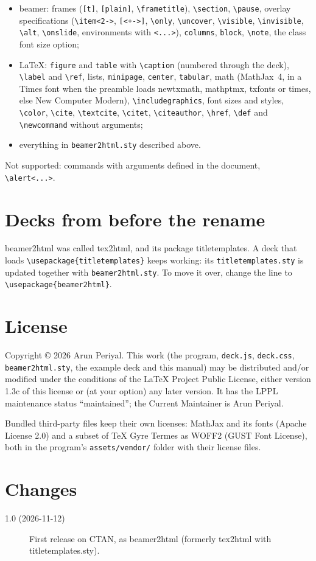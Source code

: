 \documentclass[a4paper,11pt]{article}
\newcommand\pkg{\textsf{beamer2html}}
\newcommand\cs[1]{\texttt{\textbackslash #1}}
\newcommand\env[1]{\texttt{#1}}
\newcommand\opt[1]{\texttt{#1}}
\newcommand\file[1]{\texttt{#1}}
\begin{document}
\begin{itemize}
\item beamer: frames (\opt{[t]}, \opt{[plain]}, \cs{frametitle}),
  \cs{section}, \cs{pause}, overlay specifications (\verb|\item<2->|,
  \verb|[<+->]|, \cs{only}, \cs{uncover}, \cs{visible}, \cs{invisible},
  \cs{alt}, \cs{onslide}, environments with \verb|<...>|), \env{columns},
  \env{block}, \cs{note}, the class font size option;
\item LaTeX: \env{figure} and \env{table} with \cs{caption} (numbered through
  the deck), \cs{label} and \cs{ref}, lists, \env{minipage}, \env{center},
  \env{tabular}, math (MathJax~4, in a Times font when the preamble loads
  \textsf{newtxmath}, \textsf{mathptmx}, \textsf{txfonts} or \textsf{times},
  else New Computer Modern), \cs{includegraphics}, font sizes and styles,
  \cs{color}, \cs{cite}, \cs{textcite}, \cs{citet}, \cs{citeauthor},
  \cs{href}, \cs{def} and \cs{newcommand} without arguments;
\item everything in \file{beamer2html.sty} described above.
\end{itemize}
Not supported: commands with arguments defined in the document,
\verb|\alert<...>|.

\section{Decks from before the rename}

\pkg{} was called \textsf{tex2html}, and its package \textsf{titletemplates}.
A deck that loads \verb|\usepackage{titletemplates}| keeps working: its
\file{titletemplates.sty} is updated together with \file{beamer2html.sty}.
To move it over, change the line to \verb|\usepackage{beamer2html}|.

\section{License}

Copyright \copyright{} 2026 Arun Periyal. This work (the program,
\file{deck.js}, \file{deck.css}, \file{beamer2html.sty}, the example deck
and this manual) may be distributed and/or modified under the conditions of
the \LaTeX{} Project Public License, either version 1.3c of this license or
(at your option) any later version. It has the LPPL maintenance status
``maintained''; the Current Maintainer is Arun Periyal.

Bundled third-party files keep their own licenses: MathJax and its fonts
(Apache License 2.0) and a subset of TeX Gyre Termes as WOFF2 (GUST Font
License), both in the program's \file{assets/vendor/} folder with their
license files.

\section{Changes}

\begin{description}
\item[1.0 (2026-11-12)] First release on CTAN, as \pkg{} (formerly
  \textsf{tex2html} with \textsf{titletemplates.sty}).
\end{description}
\end{document}
